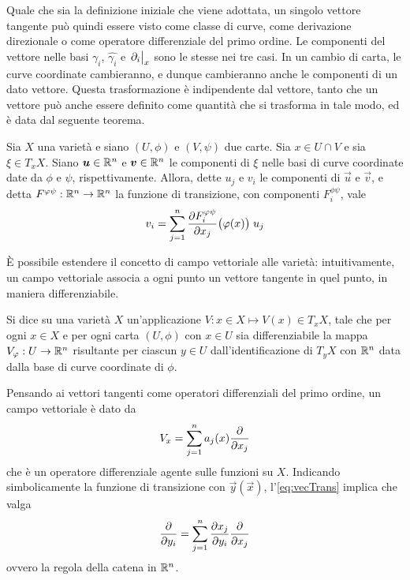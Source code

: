 Quale che sia la definizione iniziale che viene adottata, un singolo vettore tangente può quindi essere visto come classe di curve, come derivazione direzionale o come operatore differenziale del primo ordine. Le componenti del vettore nelle basi  $\gamma_i$, $\hat{\gamma_i}$ e $\eval{\partial_i}_x$ sono le stesse nei tre casi. In un cambio di carta, le curve coordinate cambieranno, e dunque cambieranno anche le componenti di un dato vettore. Questa trasformazione è indipendente dal vettore, tanto che un vettore può anche essere definito come quantità che si trasforma in tale modo, ed è data dal seguente teorema.
\begin{theorem} 
  Sia $X$ una varietà e siano $(U,\phi)$ e $(V,\psi)$ due carte. Sia $x \in  U \cap V$ e sia $\xi \in  T_x X$. Siano $\boldsymbol{u} \in \mathbb{R}^{n}$ e $\boldsymbol{v} \in  \mathbb{R}^{n}$ le componenti di $\xi$ nelle basi di curve coordinate date da $\phi$ e $\psi$, rispettivamente. Allora, dette $u_j$ e $v_i$ le componenti di $\vec{u}$ e $\vec{v}$, e detta $F^{\varphi\psi}:\mathbb{R}^{n} \to \mathbb{R}^{n}$ la funzione di transizione, con componenti $F^{\phi \psi}_i$, vale \begin{equation} \label{eq:vecTrans}
  v_i = \sum_{j=1}^n \pdv{F^{\varphi\psi}_i}{x_j}\big(\varphi(x)\big)\; u_j
  \end{equation} 
\end{theorem}

È possibile estendere il concetto di campo vettoriale alle varietà: intuitivamente, un campo vettoriale associa a ogni punto un vettore tangente in quel punto, in maniera differenziabile.
\begin{definition} \label{def:vecField}
  Si dice  su una varietà $X$ un'applicazione $V: x \in  X \mapsto V (x) \in T_x X$, tale che per ogni $x \in X$ e per ogni carta $(U, \phi)$ con $x \in U$ sia differenziabile la mappa $V_\varphi:U \to \mathbb{R}^{n}$ risultante per ciascun $y \in  U$ dall'identificazione di $T_y X$ con $\mathbb{R}^{n}$ data dalla base di curve coordinate di $\phi$.
\end{definition}

Pensando ai vettori tangenti come operatori differenziali del primo ordine, un campo vettoriale è dato da
\begin{equation*}
  V_x = \sum_{j=1}^{n} a_j(x) \pdv{x_j}
\end{equation*} 
che è un operatore differenziale agente sulle funzioni su $X$. Indicando simbolicamente la funzione di transizione con $\vec{y}(\vec{x})$, l'\autoref{eq:vecTrans} implica che valga 
\begin{equation*}
  \pdv{y_i} = \sum_{j=1}^{n} \pdv{x_j}{y_i} \pdv{x_j}
\end{equation*} 
ovvero la regola della catena in $\mathbb{R}^{n}$.

